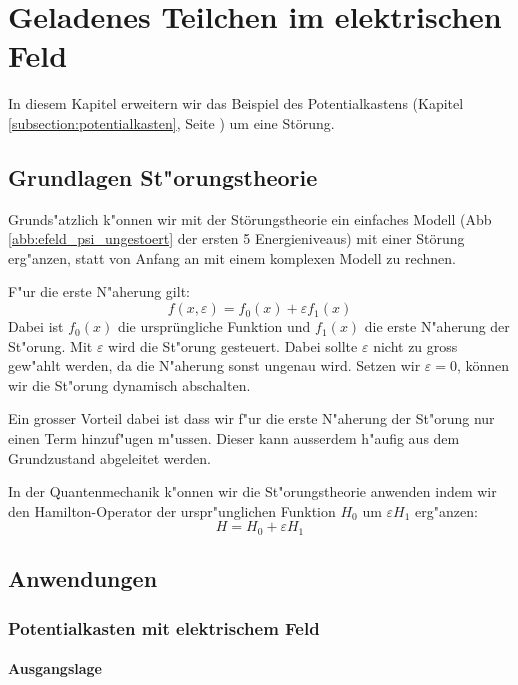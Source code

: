 \chapter{Geladenes Teilchen im elektrischen Feld\label{chapter:efeld}}
\begin{refsection}


In diesem Kapitel erweitern wir das Beispiel des Potentialkastens 
(Kapitel \ref{subsection:potentialkasten}, Seite \pageref{subsection:potentialkasten})
um eine St\"orung.

\section{Grundlagen St"orungstheorie}
Grunds"atzlich k"onnen wir mit der St\"orungstheorie ein einfaches Modell 
(Abb \ref{abb:efeld_psi_ungestoert} der ersten 5 Energieniveaus) 
mit einer St\"orung erg"anzen, statt von Anfang an mit einem komplexen Modell zu rechnen.

F"ur die erste N"aherung gilt:
\[
  f(x, \varepsilon) = f_0(x) + \varepsilon f_1(x)
\]
Dabei ist $f_0(x)$ die urspr\"ungliche Funktion und $f_1(x)$ die erste  N"aherung der St"orung.
Mit $\varepsilon$ wird die St"orung gesteuert. Dabei sollte $\varepsilon$ nicht zu gross gew"ahlt werden, 
da die N"aherung sonst ungenau wird. 
Setzen wir $\varepsilon = 0$, k\"onnen wir die St"orung dynamisch abschalten.

Ein grosser Vorteil dabei ist dass wir f"ur die erste N"aherung der St"orung nur einen Term hinzuf"ugen m"ussen.
Dieser kann ausserdem h"aufig aus dem Grundzustand abgeleitet werden.

In der Quantenmechanik k"onnen wir die St"orungstheorie anwenden indem wir den Hamilton-Operator der 
urspr"unglichen Funktion $H_0$ um $\varepsilon H_1$ erg"anzen:
\[
  H = H_0 + \varepsilon H_1
\]




\section{Anwendungen}

\subsection{Potentialkasten mit elektrischem Feld}

\subsubsection{Ausgangslage}


\end{refsection}
